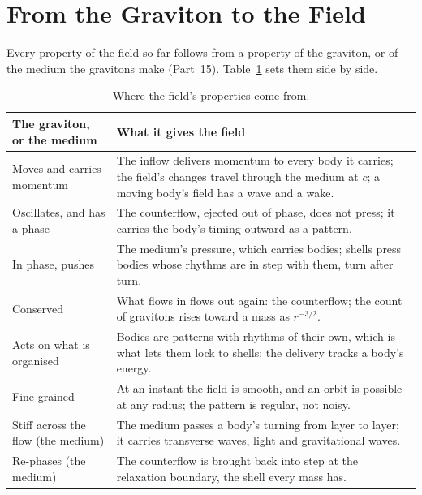 \documentclass[11pt,a4paper]{article}
\begin{document}
\section{From the Graviton to the Field}
\label{sec:traits}

Every property of the field so far follows from a property of the graviton, or of the medium the gravitons make (Part~15). Table~\ref{tab:traits} sets them side by side.

\begin{table}[H]
\centering
\small
\renewcommand{\arraystretch}{1.25}
\begin{tabular}{@{}>{\raggedright\arraybackslash}p{}>{\raggedright\arraybackslash}p{}@{}}
\toprule
\textbf{The graviton, or the medium} & \textbf{What it gives the field} \\
\midrule
Moves and carries momentum & The inflow delivers momentum to every body it carries; the field's changes travel through the medium at $c$; a moving body's field has a wave and a wake. \\
Oscillates, and has a phase & The counterflow, ejected out of phase, does not press; it carries the body's timing outward as a pattern. \\
In phase, pushes & The medium's pressure, which carries bodies; shells press bodies whose rhythms are in step with them, turn after turn. \\
Conserved & What flows in flows out again: the counterflow; the count of gravitons rises toward a mass as $r^{-3/2}$. \\
Acts on what is organised & Bodies are patterns with rhythms of their own, which is what lets them lock to shells; the delivery tracks a body's energy. \\
Fine-grained & At an instant the field is smooth, and an orbit is possible at any radius; the pattern is regular, not noisy. \\
Stiff across the flow (the medium) & The medium passes a body's turning from layer to layer; it carries transverse waves, light and gravitational waves. \\
Re-phases (the medium) & The counterflow is brought back into step at the relaxation boundary, the shell every mass has. \\
\bottomrule
\end{tabular}
\caption{Where the field's properties come from.}
\label{tab:traits}
\end{table}

 
\end{document}

